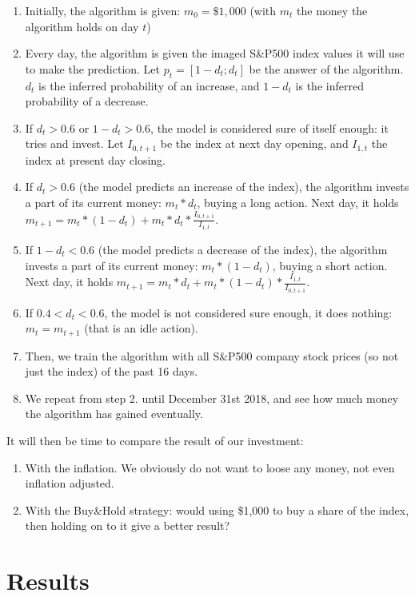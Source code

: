\documentclass[11pt]{article}
\begin{document}
\begin{onehalfspace}
\begin{enumerate}
    \item Initially, the algorithm is given: $m_0 = \$1,000$ (with $m_t$ the money the algorithm holds on day $t$)
    \item Every day, the algorithm is given the imaged S\&P500 index values it will use to make the prediction. Let $p_t = [1 - d_t;d_t]$ be the answer of the algorithm. $d_t$ is the inferred probability of an increase, and $1-d_t$ is the inferred probability of a decrease.
    \item If $d_t > 0.6$ or $1 - d_t > 0.6$, the model is considered sure of itself enough: it tries and invest. Let $I_{0,t+1}$ be the index at next day opening, and $I_{1,t}$ the index at present day closing.
    \item If $d_t > 0.6$ (the model predicts an increase of the index), the algorithm invests a part of its current money: $m_t * d_t$, buying a long action. Next day, it holds $m_{t+1} = m_t * (1-d_t) + m_t * d_t * \frac{I_{0,t+1}}{I_{1,t}}$.    
    \item If $1 - d_t < 0.6$ (the model predicts a decrease of the index), the algorithm invests a part of its current money: $m_t * (1- d_t)$, buying a short action. Next day, it holds $m_{t+1} = m_t * d_t + m_t * (1 - d_t) * \frac{I_{1,t}}{I_{0,t+1}}$.
    \item If $0.4 < d_t < 0.6$, the model is not considered sure enough, it does nothing: $m_t = m_{t+1}$ (that is an idle action).
    \item Then, we train the algorithm with all S\&P500 company stock prices (so not just the index) of the past 16 days. 
    \item We repeat from step 2. until December 31st 2018, and see how much money the algorithm has gained eventually.
\end{enumerate}

It will then be time to compare the result of our investment:

\begin{enumerate}
    \item With the inflation. We obviously do not want to loose any money, not even inflation adjusted.
    \item With the Buy\&Hold strategy: would using \$1,000 to buy a share of the index, then holding on to it give a better result?
\end{enumerate}

\pagebreak

\section{Results}
\label{results}


\end{onehalfspace}
\end{document}
